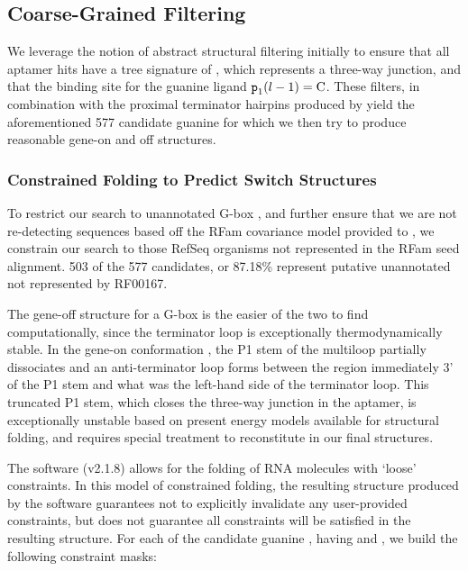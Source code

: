 \subsection{Coarse-Grained Filtering} \label{sub:coarse}

We leverage the notion of abstract structural filtering initially to ensure that all \infernal aptamer hits have a tree signature of \ms{[0, 1, 2, 2]}, which represents a three-way junction, and that the binding site for the guanine ligand ${\text{\mbox{\tt p}}}_{\text{1}}(l - 1) = \text{C}$. These filters, in combination with the proximal terminator hairpins produced by \tthp yield the aforementioned 577 candidate guanine \rbs for which we then try to produce reasonable gene-on and off structures.

\subsubsection{Constrained Folding to Predict Switch Structures} \label{ssub:constfold}

To restrict our search to unannotated G-box \rbs, and further ensure that we are not re-detecting sequences based off the RFam covariance model provided to \infernal, we constrain our search to those RefSeq organisms not represented in the RFam seed alignment. 503 of the 577 candidates, or 87.18\% represent putative unannotated \rbs not represented by RF00167.

The gene-off structure \strOff for a G-box \rb is the easier of the two to find computationally, since the terminator loop is exceptionally thermodynamically stable. In the gene-on conformation \strOn, the P1 stem of the multiloop partially dissociates and an anti-terminator loop forms between the region immediately 3' of the P1 stem and what was the left-hand side of the terminator loop. This truncated P1 stem, which closes the three-way junction in the aptamer, is exceptionally unstable based on present energy models available for structural folding, and requires special treatment to reconstitute in our final structures.

The software \rfold (v2.1.8) allows for the folding of RNA molecules with `loose' constraints. In this model of constrained folding, the resulting structure produced by the software guarantees not to explicitly invalidate any user-provided constraints, but does not guarantee all constraints will be satisfied in the resulting structure. For each of the candidate guanine \rbs, having \treeFor{\infernal} and \treeFor{\tthp}, we build the following constraint masks:

